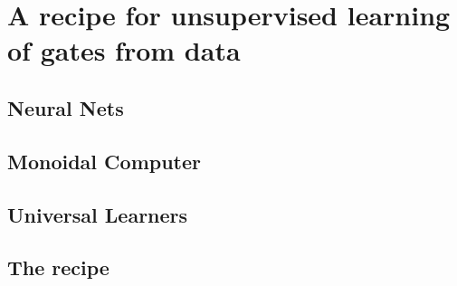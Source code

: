 \section{A recipe for unsupervised learning of gates from data}

\subsection{Neural Nets}

\subsection{Monoidal Computer}

\subsection{Universal Learners}

\subsection{The recipe}